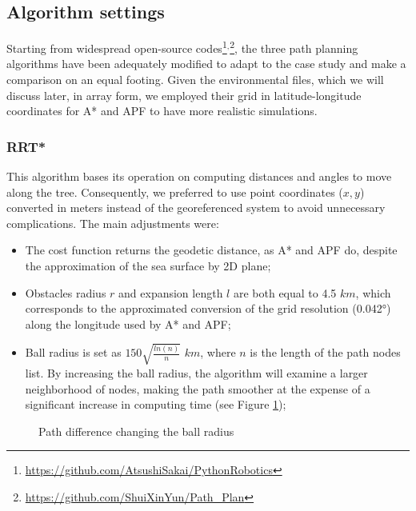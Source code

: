 \subsection{Algorithm settings}
Starting from widespread open-source codes\footnote{\url{https://github.com/AtsushiSakai/PythonRobotics}}$^,$\footnote{\url{https://github.com/ShuiXinYun/Path_Plan}}, the three path planning algorithms have been adequately modified to adapt to the case study and make a comparison on an equal footing. Given the environmental files, which we will discuss later,  in array form, we employed their grid in latitude-longitude coordinates for A* and APF to have more realistic simulations.
\subsubsection{RRT*}
This algorithm bases its operation on computing distances and angles to move along the tree. Consequently, we preferred to use point coordinates ($x,y$) converted in meters instead of the georeferenced system to avoid unnecessary complications. The main adjustments were:
\begin{itemize}[itemsep=0pt]
	\item The cost function returns the geodetic distance, as A* and APF do, despite the approximation of the sea surface by 2D plane;
	\item Obstacles radius $r$ and expansion length $l$ are both equal to 4.5 $km$, which corresponds to the approximated conversion of the grid resolution (0.042°) along the longitude used by A* and APF;
	\item Ball radius is set as $150\sqrt{\frac{ln(n)}{n}}$ $km$, where $n$ is the length of the path nodes list. By increasing the ball radius, the algorithm will examine a larger neighborhood of nodes, making the path smoother at the expense of a significant increase in computing time (see Figure \ref{changinggamma});
\end{itemize}
\begin{figure}[h]
	\centering
	\hspace{0.2cm}
	\centering
	\caption{Path difference changing the ball radius} 
	\label{changinggamma}
\end{figure}
